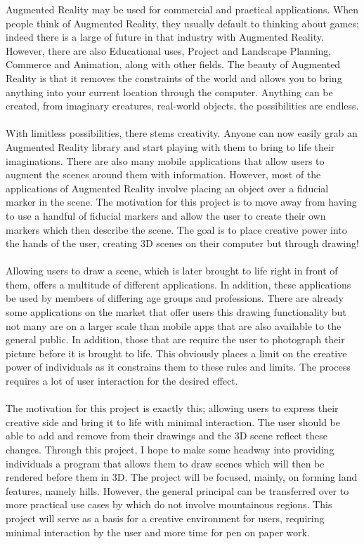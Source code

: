 \documentclass[11pt]{article}
\begin{document}
Augmented Reality may be used for commercial and practical applications. 
When people think of Augmented Reality, they usually default to 
thinking about games; indeed there is a large of future in that industry 
with Augmented Reality. However, there are also Educational uses, Project 
and Landscape Planning, Commerce and Animation, along with other fields. 
The beauty of Augmented Reality is that it removes
the constraints of the world and allows you to bring anything into your
current location through the computer. Anything can be created, from 
imaginary creatures, real-world objects, the possibilities are endless.\\ 
\\
With limitless possibilities, there stems creativity. Anyone can now
easily grab an Augmented Reality library and start playing with them to 
bring to life
their imaginations. There are also many mobile applications that allow
users to augment the scenes around them with information. However, most
of the applications of Augmented Reality involve placing an object over
a fiducial marker in the scene. The motivation for this project is to 
move away from having to use a handful of fiducial markers and allow
the user to create their own markers which then describe the scene.
The goal is to place creative power into the hands of the user,
creating 3D scenes on their computer but through drawing!\\
\\
Allowing users to draw a scene, which is later brought to life right 
in front of them, offers a multitude of different applications. In addition,
these applications be used by members of differing age groups and professions. 
There are already some applications on the market that offer users this drawing 
functionality but not many are on a larger scale than mobile apps
that are also available to the general public. In addition, those that
are require the user to photograph their picture before it is brought to life.
This obviously places a limit on the creative power of individuals as
it constrains them to these rules and limits. The process requires a lot 
of user interaction for the desired effect. \\
\\
The motivation for this project is exactly this; allowing users to 
express their creative side and bring it to life with minimal interaction.
The user should be able to add and remove from their drawings and the
3D scene reflect these changes.
Through this project, I hope to make some headway into providing 
individuals a program that allows them to draw scenes which
will then be rendered before them in 3D. The project will be focused,
mainly, on forming land features, namely hills. However, the general 
principal can be transferred over to more practical use cases by 
which do not involve mountainous regions. This project will serve as 
a basis for a creative environment for users, requiring 
minimal interaction by the user and more time for pen on paper work.
\end{document}
